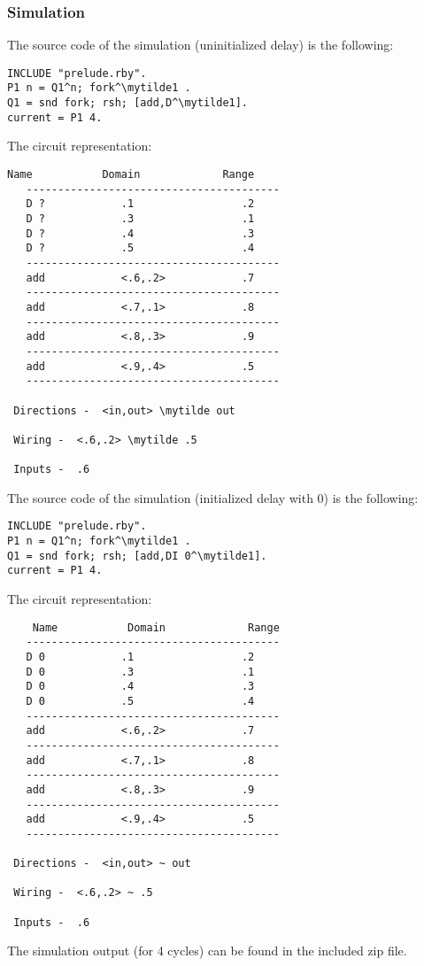 \documentclass[a4paper,10pt]{article}
\newcommand{\mytilde}{$\sim$}
\begin{document}
\subsubsection*{Simulation}
The source code of the simulation (uninitialized delay) is the following:
\begin{Verbatim}[commandchars=\\\{\}]
INCLUDE "prelude.rby".
P1 n = Q1^n; fork^\mytilde1 .
Q1 = snd fork; rsh; [add,D^\mytilde1].
current = P1 4.
\end{Verbatim}
The circuit representation:
\begin{Verbatim}[commandchars=\\\{\}]
   Name           Domain             Range
   ----------------------------------------
   D ?            .1                 .2
   D ?            .3                 .1
   D ?            .4                 .3
   D ?            .5                 .4
   ----------------------------------------
   add            <.6,.2>            .7
   ----------------------------------------
   add            <.7,.1>            .8
   ----------------------------------------
   add            <.8,.3>            .9
   ----------------------------------------
   add            <.9,.4>            .5
   ----------------------------------------

 Directions -  <in,out> \mytilde out

 Wiring -  <.6,.2> \mytilde .5

 Inputs -  .6
\end{Verbatim}

The source code of the simulation (initialized delay with 0) is the following:
\begin{Verbatim}[commandchars=\\\{\}]
INCLUDE "prelude.rby".
P1 n = Q1^n; fork^\mytilde1 .
Q1 = snd fork; rsh; [add,DI 0^\mytilde1].
current = P1 4.
\end{Verbatim}
The circuit representation:
\begin{Verbatim}
    Name           Domain             Range
   ----------------------------------------
   D 0            .1                 .2
   D 0            .3                 .1
   D 0            .4                 .3
   D 0            .5                 .4
   ----------------------------------------
   add            <.6,.2>            .7
   ----------------------------------------
   add            <.7,.1>            .8
   ----------------------------------------
   add            <.8,.3>            .9
   ----------------------------------------
   add            <.9,.4>            .5
   ----------------------------------------

 Directions -  <in,out> ~ out

 Wiring -  <.6,.2> ~ .5

 Inputs -  .6

\end{Verbatim}
The simulation output (for 4 cycles) can be found in the included zip file.
\end{document}
